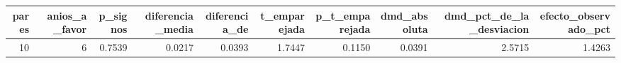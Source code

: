 \begin{tabular}{rrrrrrrrrr}
\toprule
pares & anios\_a\_favor & p\_signos & diferencia\_media & diferencia\_de & t\_emparejada & p\_t\_emparejada & dmd\_absoluta & dmd\_pct\_de\_la\_desviacion & efecto\_observado\_pct \\
\midrule
10 & 6 & 0.7539 & 0.0217 & 0.0393 & 1.7447 & 0.1150 & 0.0391 & 2.5715 & 1.4263 \\
\bottomrule
\end{tabular}
